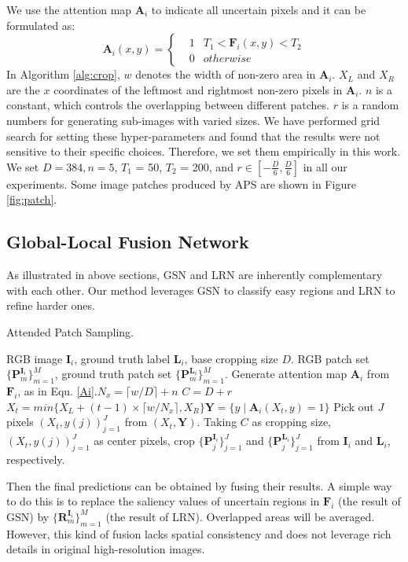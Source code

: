 \documentclass[10pt,twocolumn,letterpaper]{article}
\begin{document}
We use the attention map $\bm{A}_i$ to indicate all uncertain pixels and it can be formulated as:
\begin{equation}\label{Ai}
\bm{A}_{i}(x,y)=
\left\{
\begin{aligned}
&1    &  T_1<\bm{F}_i(x,y)<T_2\\
&0    &otherwise
\end{aligned}
\right.
\end{equation}
In Algorithm \ref{alg:crop}, $w$ denotes the width of non-zero area in $\bm{A}_i$. $X_L$ and $X_R$ are the $x$ coordinates of the leftmost and rightmost non-zero pixels in $\bm{A}_i$. $n$ is a constant, which controls the overlapping between different patches. $r$ is a random numbers for generating sub-images with varied sizes.
We have performed grid search for setting these hyper-parameters and found that the results were not sensitive to their specific choices.
Therefore, we set them empirically in this work.
We set $D=384, n = 5$, $T_1$ = 50, $T_2$ = 200, and $r\in [-\frac{D}{6}, \frac{D}{6}]$ in all our experiments. Some image patches produced by APS are shown in Figure \ref{fig:patch}.

\subsection{Global-Local Fusion Network}\label{44}

As illustrated in above sections, GSN and LRN are inherently complementary with each other. Our method leverages GSN to classify easy regions and LRN to refine harder ones.
\begin{algorithm}[t]
\caption{Attended Patch Sampling.}
\begin{algorithmic}[1]
\label{alg:crop}
\REQUIRE RGB image $\bm{I}_i$, ground truth label $\bm{L}_i$, base cropping size $D$.
\ENSURE RGB patch set $\{\bm{P}_m^{\bm{I}_i}\}_{m=1}^M$, ground truth patch set $\{\bm{P}_m^{\bm{L}_i}\}_{m=1}^M$.
\STATE Generate attention map $\bm{A}_i$ from $\bm{F}_i$, as in Equ. \ref{Ai}.\STATE $N_x=\lceil w/D\rceil+n$
\STATE $C = D + r$
\STATE $X_t=min\{X_L+(t-1)\times \lceil w/N_x\rceil, X_R\}$\STATE $\bm{Y} = \{y\mid \bm{A}_i (X_t, y) = 1\}$
\STATE Pick out $J$ pixels $(X_t,y(j))_{j=1}^J$ from $(X_t,\bm{Y})$.
\STATE Taking $C$ as cropping size, $(X_t,y(j))_{j=1}^J$ as center pixels, crop $\{\bm{P}_j^{\bm{I}_i}\}_{j=1}^J$ and $\{\bm{P}_j^{\bm{L}_i}\}_{j=1}^J$ from $\bm{I}_i$ and $\bm{L}_i$, respectively.
\ENDFOR
\end{algorithmic}
\end{algorithm}
Then the final predictions can be obtained by fusing their results. A simple way to do this is to replace the saliency values of uncertain regions in $\bm{F}_i$ (the result of GSN) by $\{\bm{R}_m^{\bm{I}_i}\}_{m=1}^M$ (the result of LRN). Overlapped areas will be averaged. However, this kind of fusion lacks spatial consistency and does not leverage rich details in original high-resolution images.   
\end{document}
